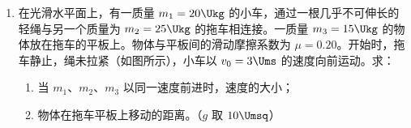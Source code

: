 \documentclass[\gkver]{gaokaozhenti}
\begin{document}
\begin{enumerate}
{$E_{ab}=B_{0}\times5r_{0}\times3r_{0}\omega\times0.8=12B_{0}r_{0}^{2}\omega$ ④

cd 边中的感生电动势与 ab 边中的感生电动势的大小相同，而且又是串联在一起的，所以这一瞬间导线框中的感生电动势是

$E=2E_{ab}=24B_{0}r_{0}^{2}\omega$ ⑤

\onepicture[align=right, h=5.90cm]{}

（2）当导线框位于给定位置时，导线 ab 所在处的磁感应强度的大小为 $B_{0}$，磁场的方向与通电导线 ab 垂直，如图所示。所以磁场对导线 ab 的作用力的大小为

$f_{ab}=B_{0}I\cdot ab=5Ir_{0}B_{0}$ ⑥

磁场对 cd 边的作用力的大小等于

$f_{cd}=5Ir_{0}B_{0}$ ⑦

$f_{ab}$ 对转轴的力矩

$M_{ab}=f_{ab}L_{2}=f_{ab}\cdot O'b\cdot\cos\theta=5Ir_{0}B_{0}\times3r_{0}\times0.8=12B_{0}r_{0}^{2}I$ ⑧

$f_{cd}$ 对转轴的力矩 $M_{cd}$ 的大小等于 $M_{ab}$，两个力矩都有使导线框作顺时针转动的趋势，故合力矩

$M=M_{ab}+M_{cd}=24B_{0}r_{0}^{2}I$ ⑨
}

\item
在光滑水平面上，有一质量 $m_{1}=20\Ukg$ 的小车，通过一根几乎不可伸长的轻绳与另一个质量为 $m_{2}=25\Ukg$ 的拖车相连接。一质量 $m_{3}=15\Ukg$ 的物体放在拖车的平板上。物体与平板间的滑动摩擦系数为 $\mu=0.20$。开始时，拖车静止，绳未拉紧（如图所示），小车以 $v_{0}=3\Ums$ 的速度向前运动。求：
\begin{enumerate}
	\item
	当 $m_{1}$、$m_{2}$、$m_{3}$ 以同一速度前进时，速度的大小；
	\item
	物体在拖车平板上移动的距离。（$g$ 取 $10\Umsq$）
\end{enumerate}
\onepicture[align=right, w=9.13cm]{}
{}
\end{enumerate}
\end{document}
